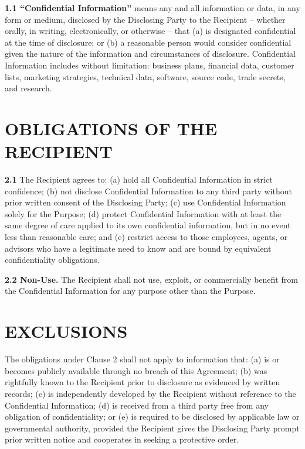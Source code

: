 \documentclass[10pt]{article}
\begin{document}
\textbf{1.1 ``Confidential Information''} means any and all information or data, in any form or medium, disclosed by the Disclosing Party to the Recipient -- whether orally, in writing, electronically, or otherwise -- that (a) is designated confidential at the time of disclosure; or (b) a reasonable person would consider confidential given the nature of the information and circumstances of disclosure. Confidential Information includes without limitation: business plans, financial data, customer lists, marketing strategies, technical data, software, source code, trade secrets, and research.


\section{OBLIGATIONS OF THE RECIPIENT}

\textbf{2.1} The Recipient agrees to: (a) hold all Confidential Information in strict confidence; (b) not disclose Confidential Information to any third party without prior written consent of the Disclosing Party; (c) use Confidential Information solely for the Purpose; (d) protect Confidential Information with at least the same degree of care applied to its own confidential information, but in no event less than reasonable care; and (e) restrict access to those employees, agents, or advisors who have a legitimate need to know and are bound by equivalent confidentiality obligations.

\textbf{2.2 Non-Use.} The Recipient shall not use, exploit, or commercially benefit from the Confidential Information for any purpose other than the Purpose.

\section{EXCLUSIONS}

The obligations under Clause 2 shall not apply to information that: (a) is or becomes publicly available through no breach of this Agreement; (b) was rightfully known to the Recipient prior to disclosure as evidenced by written records; (c) is independently developed by the Recipient without reference to the Confidential Information; (d) is received from a third party free from any obligation of confidentiality; or (e) is required to be disclosed by applicable law or governmental authority, provided the Recipient gives the Disclosing Party prompt prior written notice and cooperates in seeking a protective order.
\end{document}
